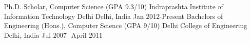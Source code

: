 \begin{cventries}
  \cventry
    {Ph.D. Scholar, Computer Science (GPA 9.3/10)}
    {Indraprashta Institute of Information Technology Delhi}
    {Delhi, India}
    {Jan 2012-Present}
	{}
  \cventry
   {Bachelors of Engineering (Hons.), Computer Science (GPA 9/10)}
   {Delhi College of Engineering}
   {Delhi, India}
   {Jul 2007 -April 2011}
   {}
  \end{cventries}
  \vspace{-20pt}
